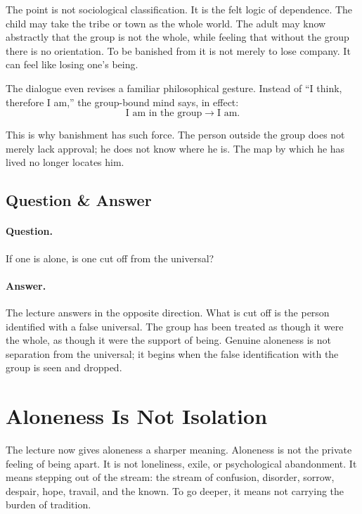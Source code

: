 The point is not sociological classification. It is the felt logic of dependence. The child may take the tribe or town as the whole world. The adult may know abstractly that the group is not the whole, while feeling that without the group there is no orientation. To be banished from it is not merely to lose company. It can feel like losing one's being.

The dialogue even revises a familiar philosophical gesture. Instead of ``I think, therefore I am,'' the group-bound mind says, in effect:
\begin{equation}
\text{I am in the group} \longrightarrow \text{I am}.
\end{equation}

This is why banishment has such force. The person outside the group does not merely lack approval; he does not know where he is. The map by which he has lived no longer locates him.

\subsection{Question \& Answer}

\paragraph{Question.}
If one is alone, is one cut off from the universal?

\paragraph{Answer.}
The lecture answers in the opposite direction. What is cut off is the person identified with a false universal. The group has been treated as though it were the whole, as though it were the support of being. Genuine aloneness is not separation from the universal; it begins when the false identification with the group is seen and dropped.

\section{Aloneness Is Not Isolation}

The lecture now gives aloneness a sharper meaning. Aloneness is not the private feeling of being apart. It is not loneliness, exile, or psychological abandonment. It means stepping out of the stream: the stream of confusion, disorder, sorrow, despair, hope, travail, and the known. To go deeper, it means not carrying the burden of tradition.

